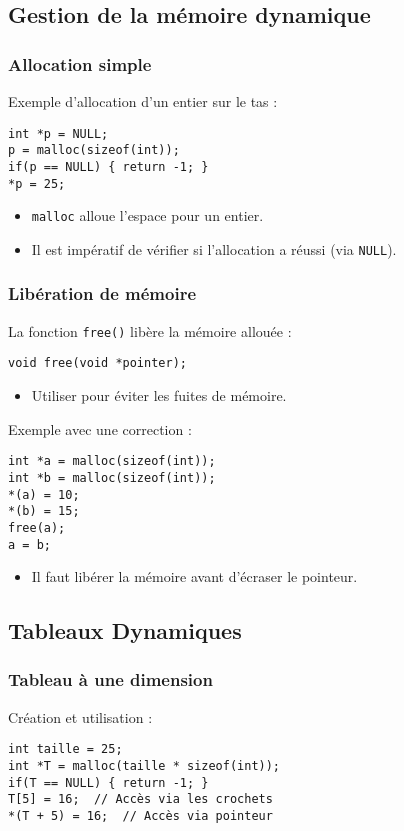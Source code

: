 \documentclass[french,11pt]{article}
\begin{document}
\subsection{Gestion de la mémoire dynamique}

\subsubsection{Allocation simple}
Exemple d’allocation d’un entier sur le tas :
\begin{verbatim}
int *p = NULL;
p = malloc(sizeof(int));
if(p == NULL) { return -1; }
*p = 25;
\end{verbatim}
\begin{itemize}
    \item \texttt{malloc} alloue l’espace pour un entier.
    \item Il est impératif de vérifier si l’allocation a réussi (via \texttt{NULL}).
\end{itemize}

\subsubsection{Libération de mémoire}
La fonction \texttt{free()} libère la mémoire allouée :
\begin{verbatim}
void free(void *pointer);
\end{verbatim}
\begin{itemize}
    \item Utiliser pour éviter les fuites de mémoire.
\end{itemize}

Exemple avec une correction :
\begin{verbatim}
int *a = malloc(sizeof(int));
int *b = malloc(sizeof(int));
*(a) = 10;
*(b) = 15;
free(a);
a = b;
\end{verbatim}
\begin{itemize}
    \item Il faut libérer la mémoire avant d'écraser le pointeur.
\end{itemize}

\subsection{Tableaux Dynamiques}

\subsubsection{Tableau à une dimension}
Création et utilisation :
\begin{verbatim}
int taille = 25;
int *T = malloc(taille * sizeof(int));
if(T == NULL) { return -1; }
T[5] = 16;  // Accès via les crochets
*(T + 5) = 16;  // Accès via pointeur
\end{verbatim}
\end{document}

